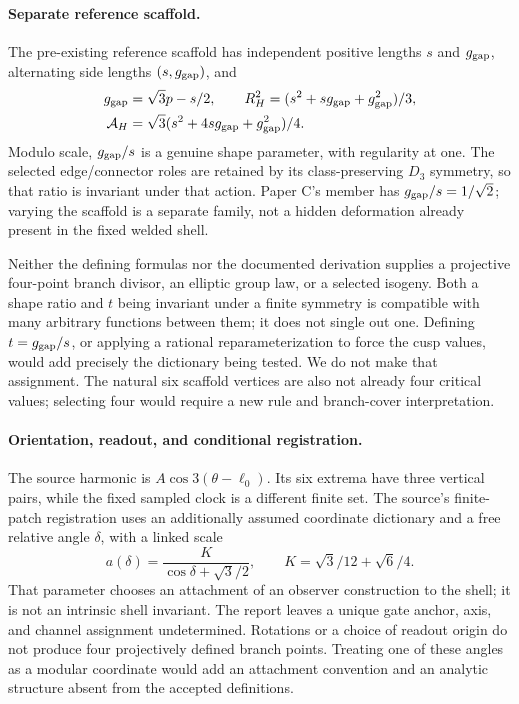 \paragraph{Separate reference scaffold.}
The pre-existing reference scaffold \cite{scaffold} has independent positive lengths \(s\) and \(g_{\rm gap}\), alternating side lengths \((s,g_{\rm gap})\), and
\begin{equation}\label{eq:scaffold}
 \begin{split}
 g_{\rm gap}&=\sqrt3p-s/2,\qquad
 R_H^2=(s^2+sg_{\rm gap}+g_{\rm gap}^2)/3,\\
 \mathcal A_H&=\sqrt3(s^2+4sg_{\rm gap}+g_{\rm gap}^2)/4.
 \end{split}
\end{equation}
Modulo scale, \(g_{\rm gap}/s\) is a genuine shape parameter, with regularity at one. The selected edge/connector roles are retained by its class-preserving \(D_3\) symmetry, so that ratio is invariant under that action. Paper C's member has \(g_{\rm gap}/s=1/\sqrt2\); varying the scaffold is a separate family, not a hidden deformation already present in the fixed welded shell.

Neither the defining formulas nor the documented derivation supplies a projective four-point branch divisor, an elliptic group law, or a selected isogeny. Both a shape ratio and \(t\) being invariant under a finite symmetry is compatible with many arbitrary functions between them; it does not single out one. Defining \(t=g_{\rm gap}/s\), or applying a rational reparameterization to force the cusp values, would add precisely the dictionary being tested. We do not make that assignment. The natural six scaffold vertices are also not already four critical values; selecting four would require a new rule and branch-cover interpretation.

\paragraph{Orientation, readout, and conditional registration.}
The source harmonic is \(A\cos3(\theta-\ell_0)\). Its six extrema have three vertical pairs, while the fixed sampled clock is a different finite set. The source's finite-patch registration uses an additionally assumed coordinate dictionary and a free relative angle \(\delta\), with a linked scale
\begin{equation}\label{eq:registration}
 a(\delta)=\frac{K}{\cos\delta+\sqrt3/2},\qquad
 K=\sqrt3/12+\sqrt6/4.
\end{equation}
That parameter chooses an attachment of an observer construction to the shell; it is not an intrinsic shell invariant. The report leaves a unique gate anchor, axis, and channel assignment undetermined. Rotations or a choice of readout origin do not produce four projectively defined branch points. Treating one of these angles as a modular coordinate would add an attachment convention and an analytic structure absent from the accepted definitions.

